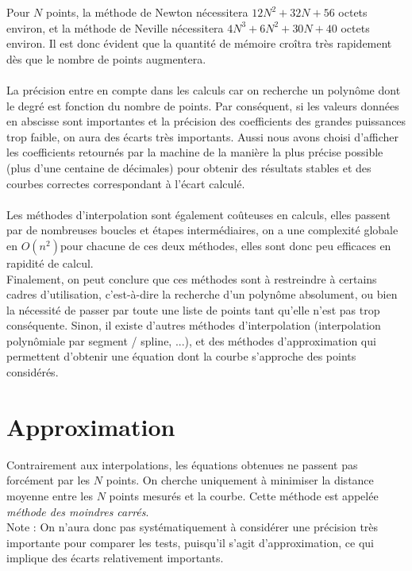 \documentclass{report}
\begin{document}
      Pour $N$ points, la méthode de Newton nécessitera $12 N^{2}+32N+56$ octets environ, et la méthode de Neville nécessitera $4 N^{3} + 6 N^{2} + 30N +40$ octets environ. Il est donc évident que la quantité de mémoire croîtra très rapidement dès que le nombre de points augmentera.\\ \\
      
      La précision entre en compte dans les calculs car on recherche un polynôme dont le degré est fonction du nombre de points. Par conséquent, si les valeurs données en abscisse sont importantes et la précision des coefficients des grandes puissances trop faible, on aura des écarts très importants. Aussi nous avons choisi d'afficher les coefficients retournés par la machine de la manière la plus précise possible (plus d'une centaine de décimales) pour obtenir des résultats stables et des courbes correctes correspondant à l'écart calculé.\\ \\
      
      Les méthodes d'interpolation sont également coûteuses en calculs, elles passent par de nombreuses boucles et étapes intermédiaires, on a une complexité globale en $O(n^2)$pour chacune de ces deux méthodes, elles sont donc peu efficaces en rapidité de calcul. \\
      Finalement, on peut conclure que ces méthodes sont à restreindre à certains cadres d'utilisation, c'est-à-dire la recherche d'un polynôme absolument, ou bien la nécessité de passer par toute une liste de points tant qu'elle n'est pas trop conséquente. Sinon, il existe d'autres méthodes d'interpolation (interpolation polynômiale par segment / spline, ...), et des méthodes d'approximation qui permettent d'obtenir une équation dont la courbe s'approche des points considérés.
      
  \chapter{Approximation}
    Contrairement aux interpolations, les équations obtenues ne passent pas forcément par les $N$ points. On cherche uniquement à minimiser la distance moyenne entre les $N$ points mesurés et la courbe. Cette méthode est appelée \textit{méthode des moindres carrés}.\\
    Note : On n'aura donc pas systématiquement à considérer une précision très importante pour comparer les tests, puisqu'il s'agit d'approximation, ce qui implique des écarts relativement importants.
\end{document}
